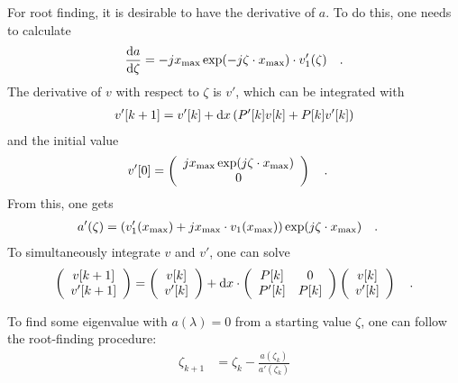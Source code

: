 \documentclass{article}
\begin{document}
For root finding, it is desirable to have the derivative of $a$. To do this, one needs to calculate 
\begin{align}
\frac{{\rm d}a}{{\rm d}\zeta} = -j x_{\rm max} \exp(-j\zeta \cdot x_{\rm max}) \cdot v_1'(\zeta) \quad .
\end{align}
The derivative of $v$ with respect to $\zeta$ is $v'$, which can be integrated with
\begin{align}
v'[k+1] = v'[k] + {\rm d}x \left( P'[k] v[k]  + P[k] v'[k] \right)
\end{align}
and the initial value
\begin{align}
v'[0] &=  \left( \begin{array}{c}jx_{\rm max}  \exp(j  \zeta \cdot  x_{\rm max}) \\ 0 \end{array} \right) \quad .
\end{align}
From this, one gets
\begin{align}
a'(\zeta) & = (v'_1(x_{\rm max}) + jx_{\rm max}\cdot v_1(x_{\rm max}))\exp(j\zeta \cdot x_{\rm max}) \quad .
\end{align}
To simultaneously integrate $v$ and $v'$, one can solve 
\begin{align}
\left( \begin{array}{c}v[k+1]\\v'[k+1] \end{array} \right) = \left( \begin{array}{c}v[k]\\v'[k] \end{array} \right) + {\rm d}x \cdot \left( \begin{array}{cc}P[k]& 0 \\ P'[k] & P[k] \end{array} \right)  \left( \begin{array}{c}v[k]\\v'[k] \end{array} \right) \quad .
\end{align}

To find some eigenvalue with $a(\lambda)=0$ from a starting value $\zeta$, one can follow the root-finding procedure: 
\begin{align} \zeta_{k+1} &= \zeta_k -  \frac{ a(\zeta_k)}{a'(\zeta_k)}\end{align}
\end{document}
